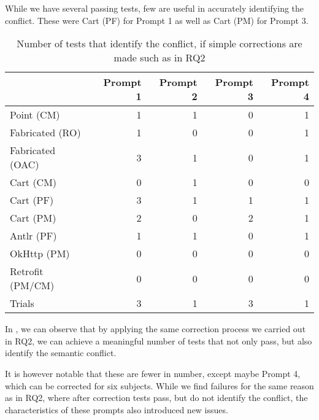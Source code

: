 While we have several passing tests, few are useful in accurately identifying the conflict.
These were Cart (PF) for Prompt 1 as well as Cart (PM) for Prompt 3.


\begin{table}[t]
    \centering
    \begin{tabular}{@{\extracolsep{\fill}} lrrrr} \toprule
                     & Prompt 1 & Prompt 2 & Prompt 3 & Prompt 4 \\
    \midrule
    Point (CM)       & 1 & 1 & 0 & 1 \\
    Fabricated (RO)  & 1 & 0 & 0 & 1 \\
    Fabricated (OAC) & 3 & 1 & 0 & 1 \\
    Cart (CM)        & 0 & 1 & 0 & 0 \\
    Cart (PF)        & 3 & 1 & 1 & 1 \\
    Cart (PM)        & 2 & 0 & 2 & 1 \\
    Antlr (PF)       & 1 & 1 & 0 & 1 \\
    OkHttp (PM)      & 0 & 0 & 0 & 0 \\
    Retrofit (PM/CM) & 0 & 0 & 0 & 0 \\
    Trials           & 3 & 1 & 3 & 1 \\
    \bottomrule
    \end{tabular}
    \caption{Number of tests that identify the conflict, if simple corrections are made such as in RQ2\label{tab:results:rq3t2}}
\end{table}

In , we can observe that by applying the same correction process we carried out in
RQ2, we can achieve a meaningful number of tests that not only pass, but also identify the semantic conflict.

It is however notable that these are fewer in number, except maybe Prompt 4, which can be corrected for six subjects.
While we find failures for the same reason as in RQ2, where after correction tests pass, but do not identify the conflict,
the characteristics of these prompts also introduced new issues.

